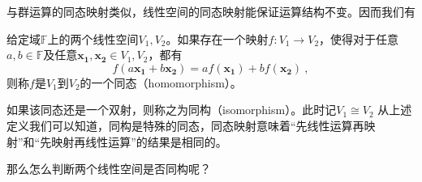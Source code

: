 

与群运算的同态映射类似，线性空间的同态映射能保证运算结构不变。因而我们有
\begin{definition}{}
给定域$\mathbb F$上的两个线性空间$V_1,V_2$。如果存在一个映射$f:V_1\rightarrow V_2$，使得对于任意$a,b\in \mathbb F$及$任意\boldsymbol{x_1,x_2}\in V_1,V_2$，都有
\begin{equation}
f(a\boldsymbol {x_1}+b\boldsymbol {x_2})=af(\boldsymbol {x_1})+bf(\boldsymbol {x_2})~,
\end{equation}
则称$f$是$V_1$到$V_2$的一个同态（homomorphism）。
\end{definition}
如果该同态还是一个双射，则称之为同构（isomorphism）。此时记$V_1\cong V_2$
从上述定义我们可以知道，同构是特殊的同态，同态映射意味着“先线性运算再映射”和“先映射再线性运算”的结果是相同的。

那么怎么判断两个线性空间是否同构呢？